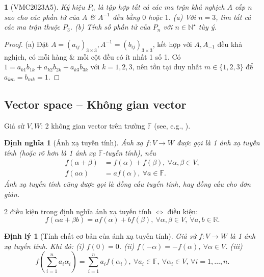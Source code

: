 \documentclass{article}
\newtheorem{baitoan}{}
\newtheorem{dinhly}{Định lý}
\newtheorem{dinhnghia}{Định nghĩa}
\begin{document}
\begin{baitoan}[VMC2023A5]
	Ký hiệu $P_n$ là tập hợp tất cả các ma trận khả nghịch $A$ cấp $n$ sao cho các phần tử của $A$ \& $A^{-1}$ đều bằng $0$ hoặc $1$. (a) Với $n = 3$, tìm tất cả các ma trận thuộc $P_3$. (b) Tính số phần tử của $P_n$ với $n\in\mathbb{N}^\star$ tùy ý.
\end{baitoan}

\begin{proof}
	(a) Đặt $A = (a_{ij})_{3\times3},A^{-1} = (b_{ij})_{3\times3}$, kết hợp với $A,A_{-1}$ đều khả nghịch, có mỗi hàng \& mỗi cột đều có ít nhất 1 số 1. Có $1 = a_{k1}b_{1k} + a_{k2}b_{2k} + a_{k3}b_{3k}$ với $k = 1,2,3$, nên tồn tại duy nhất $m\in\{1,2,3\}$ để $a_{km} = b_{mk} = 1$.
\end{proof}


\subsection{Vector space -- Không gian vector}
Giả sử $V,W$: 2 không gian vector trên trường $\mathbb{F}$ (see, e.g., \cite[Chap. 2, \S2: Ánh xạ tuyến tính, pp. 100--110]{Hung_linear_algebra}).

\begin{dinhnghia}[Ánh xạ tuyến tính]
	Ánh xạ $f:V\to W$ được gọi là 1 \emph{ánh xạ tuyến tính} (hoặc rõ hơn là 1 \emph{ánh xạ $\mathbb{F}$-tuyến tính}), nếu
	\begin{align}
		f(\alpha + \beta) &= f(\alpha) + f(\beta),\ \forall\alpha,\beta\in V,\\
		f(a\alpha) &= af(\alpha),\ \forall a\in\mathbb{F}.
	\end{align}
	Ánh xạ tuyến tính cũng được gọi là \emph{đồng cấu tuyến tính}, hay \emph{đồng cấu} cho đơn giản.
\end{dinhnghia}
2 điều kiện trong định nghĩa ánh xạ tuyến tính $\Leftrightarrow$ điều kiện:
\begin{equation}
	f(\alpha a + \beta b) = af(\alpha) + bf(\beta),\ \forall\alpha,\beta\in V,\ \forall a,b\in\mathbb{R}.
\end{equation}

\begin{dinhly}[Tính chất cơ bản của ánh xạ tuyến tính]
	Giả sử $f:V\to W$ là 1 ánh xạ tuyến tính. Khi đó: (i) $f(0) = 0$. (ii) $f(-\alpha) = -f(\alpha)$, $\forall\alpha\in V$. (iii)
	\begin{equation}
		f\left(\sum_{i=1}^n a_i\alpha_i\right) = \sum_{i=1}^n a_if(\alpha_i),\ \forall a_i\in\mathbb{F},\ \forall\alpha_i\in V,\,\forall i = 1,\ldots,n.
	\end{equation}
\end{dinhly}
\end{document}
